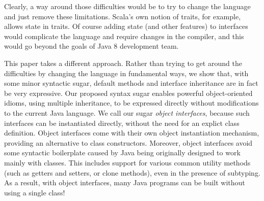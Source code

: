\noindent Clearly, a way around those difficulties would be to try to
change the language and just remove these limitations. Scala's own
notion of traits, for example, allows state in traits. Of course adding
state (and other features) to interfaces would complicate the language
and require changes in the compiler, and this would go beyond the
goals of Java 8 development team.

This paper takes a different approach. Rather than trying to get
around the difficulties by changing the language in fundamental ways,
we show that, with some minor syntactic sugar, default methods and
interface inheritance are in fact be very expressive. Our proposed
syntax sugar enables powerful object-oriented idioms, using multiple
inheritance, to be expressed directly without modifications to the
current Java language. We call our sugar \emph{object interfaces},
because such interfaces can be instantiated directly, without the need
for an explict class definition. Object interfaces come with their own
object instantiation mechanism, providing an alternative to class
constructors. Moreover, object interfaces avoid some syntactic
boilerplate caused by Java being originally designed to work mainly
with classes. This includes support for various common utility methods
(such as getters and setters, or clone methods), even in the presence
of subtyping. As a result, with object interfaces, many Java programs
can be built without using a single class!  

